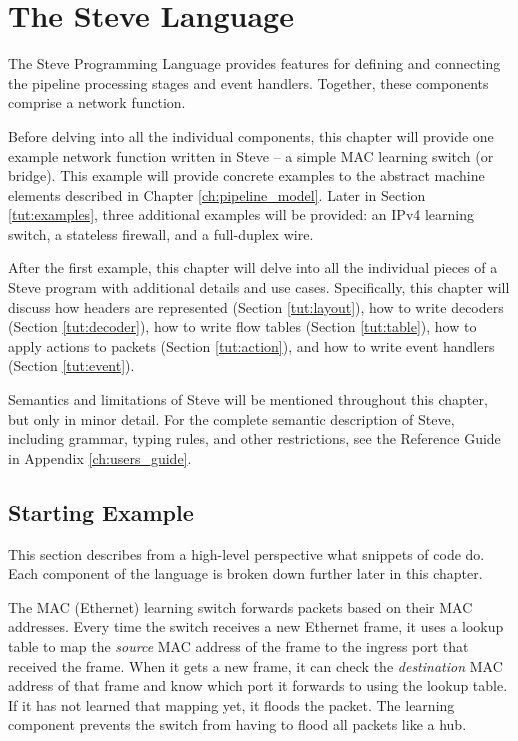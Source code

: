 \chapter{The Steve Language} \label{ch:tutorial}

%

The Steve Programming Language provides features for
defining and connecting the pipeline processing stages and event handlers. Together, these components comprise a network function.

Before delving into all the individual components, this chapter will provide one example network function
written in Steve -- a simple MAC learning switch (or bridge). This example will provide concrete examples to the abstract machine elements described in Chapter \ref{ch:pipeline_model}.
Later in Section \ref{tut:examples}, three additional examples will be provided: an IPv4 learning switch,
a stateless firewall, and a full-duplex wire.

After the first example, this chapter will delve into all the individual pieces of a Steve program with additional details and use cases.
Specifically, this chapter will discuss how headers are represented (Section \ref{tut:layout}), how to
write decoders (Section \ref{tut:decoder}), how to write flow tables (Section \ref{tut:table}), how to apply actions to packets (Section \ref{tut:action}), and how to write event handlers (Section \ref{tut:event}).

Semantics and limitations of Steve will be mentioned throughout this chapter, 
but only in minor detail. For the complete semantic description of
Steve, including grammar, typing rules, and other restrictions, see the Reference Guide in Appendix \ref{ch:users_guide}.

\section{Starting Example} \label{tut:learning_switch}

This section describes from a high-level perspective what snippets of code do. Each component of the language is broken down further later in this chapter.

The MAC (Ethernet) learning switch forwards packets based on their MAC addresses.
Every time the switch receives a new Ethernet frame, it uses a lookup table to map the \emph{source}
MAC address of the frame to the ingress port that received the frame.
When it gets a new frame, it can check the \emph{destination} MAC address of that frame
and know which port it forwards to using the lookup table.
If it has not learned that mapping yet, it floods the packet.
The learning component prevents the switch from having to flood all packets like a hub.


